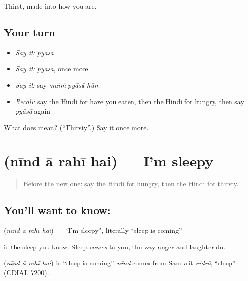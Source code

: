 \begin{grammarlens}[title={What you've built}]
Thirst, made into how you are.
\end{grammarlens}

\subsection*{Your turn}
\begin{itemize}
\raggedright
  \item \emph{Say it:} \emph{pyāsā}
  \item \emph{Say it:} \emph{pyāsā}, once more
  \item \emph{Say it:} say \emph{maiṁ pyāsā hūṁ}
  \item \emph{Recall:} say the Hindi for have you eaten, then the Hindi for hungry, then say \emph{pyāsā} again
\end{itemize}

\begin{tcolorbox}[breakable,colback=teal!4,colframe=teal!35!black,title={Before you move on}]
What does  mean? (\textquotedblleft{}Thirsty\textquotedblright{}.) Say it once more.
\end{tcolorbox}
\section[\texorpdfstring{\hi{नींद} \hi{आ} \hi{रही} \hi{है} (nīnd ā rahī hai)}{नींद आ रही है (nīnd ā rahī hai)}]{    (nīnd ā rahī hai) — I'm sleepy}

\label{lesson:HI-C124-nindaa}



\begin{quote}
Before the new one: say the Hindi for hungry, then the Hindi for thirsty.
\end{quote}

\subsection*{You'll want to know:    }
\textbf{   } (\emph{nīnd ā rahī hai}) — \textquotedblleft{}I'm sleepy\textquotedblright{}, literally \textquotedblleft{}sleep is coming\textquotedblright{}.

\textbf{} is the sleep you know. Sleep \emph{comes} to you, the way anger and laughter do.

\begin{cousinweb}
\textbf{   } (\emph{nīnd ā rahī hai}) is \textquotedblleft{}sleep is coming\textquotedblright{}. \emph{nīnd} comes from Sanskrit \emph{nidrā}, \textquotedblleft{}sleep\textquotedblright{} (CDIAL 7200).
\end{cousinweb}

